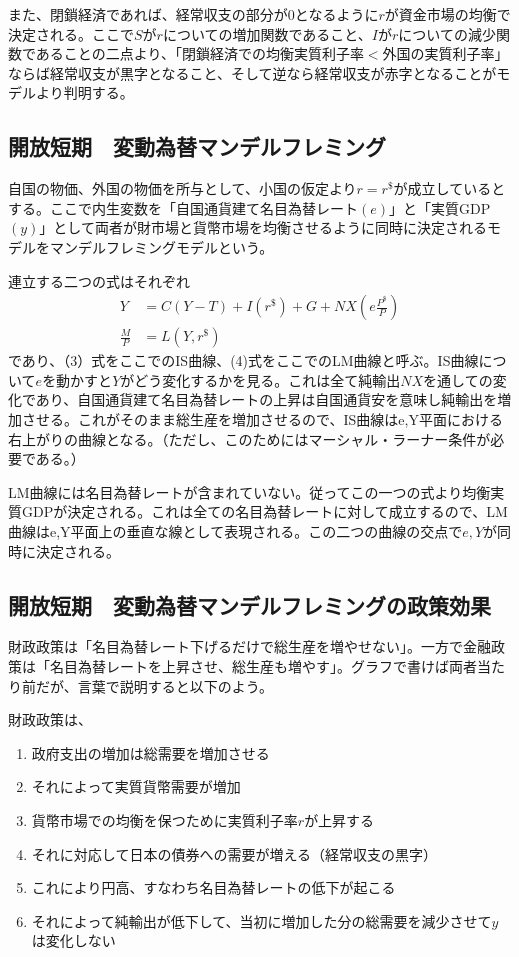 \documentclass{jsarticle}
\begin{document}
また、閉鎖経済であれば、経常収支の部分が0となるように$r$が資金市場の均衡で決定される。ここで$S$が$r$についての増加関数であること、$I$が$r$についての減少関数であることの二点より、「閉鎖経済での均衡実質利子率$<$外国の実質利子率」ならば経常収支が黒字となること、そして逆なら経常収支が赤字となることがモデルより判明する。

\subsection{開放短期　変動為替マンデルフレミング}
自国の物価、外国の物価を所与として、小国の仮定より$r = r^{\$}$が成立しているとする。ここで内生変数を「自国通貨建て名目為替レート$(e)$」と「実質GDP$(y)$」として両者が財市場と貨幣市場を均衡させるように同時に決定されるモデルをマンデルフレミングモデルという。

連立する二つの式はそれぞれ
\begin{align}
	Y &= C(Y-T) + I(r^{\$}) + G + NX(e\frac{P^{\$}}{P})\\
	\frac{M}{P} &= L(Y, r^{\$})
\end{align}
であり、（3）式をここでのIS曲線、(4)式をここでのLM曲線と呼ぶ。IS曲線について$e$を動かすと$Y$がどう変化するかを見る。これは全て純輸出$NX$を通しての変化であり、自国通貨建て名目為替レートの上昇は自国通貨安を意味し純輸出を増加させる。これがそのまま総生産を増加させるので、IS曲線はe,Y平面における右上がりの曲線となる。（ただし、このためにはマーシャル・ラーナー条件が必要である。）

LM曲線には名目為替レートが含まれていない。従ってこの一つの式より均衡実質GDPが決定される。これは全ての名目為替レートに対して成立するので、LM曲線はe,Y平面上の垂直な線として表現される。この二つの曲線の交点で$e,Y$が同時に決定される。

\subsection{開放短期　変動為替マンデルフレミングの政策効果}
財政政策は「名目為替レート下げるだけで総生産を増やせない」。一方で金融政策は「名目為替レートを上昇させ、総生産も増やす」。グラフで書けば両者当たり前だが、言葉で説明すると以下のよう。

財政政策は、
\begin{enumerate}
	\item 政府支出の増加は総需要を増加させる
	\item それによって実質貨幣需要が増加
	\item 貨幣市場での均衡を保つために実質利子率$r$が上昇する
	\item それに対応して日本の債券への需要が増える（経常収支の黒字）
	\item これにより円高、すなわち名目為替レートの低下が起こる
	\item それによって純輸出が低下して、当初に増加した分の総需要を減少させて$y$は変化しない
\end{enumerate}
\end{document}
